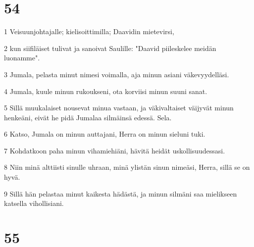 \chapter{54}

\par 1 Veisuunjohtajalle; kielisoittimilla; Daavidin mietevirsi,
\par 2 kun siifiläiset tulivat ja sanoivat Saulille: "Daavid piileskelee meidän luonamme".
\par 3 Jumala, pelasta minut nimesi voimalla, aja minun asiani väkevyydelläsi.
\par 4 Jumala, kuule minun rukoukseni, ota korviisi minun suuni sanat.
\par 5 Sillä muukalaiset nousevat minua vastaan, ja väkivaltaiset väijyvät minun henkeäni, eivät he pidä Jumalaa silmäinsä edessä. Sela.
\par 6 Katso, Jumala on minun auttajani, Herra on minun sieluni tuki.
\par 7 Kohdatkoon paha minun vihamiehiäni, hävitä heidät uskollisuudessasi.
\par 8 Niin minä alttiisti sinulle uhraan, minä ylistän sinun nimeäsi, Herra, sillä se on hyvä.
\par 9 Sillä hän pelastaa minut kaikesta hädästä, ja minun silmäni saa mielikseen katsella vihollisiani.

\chapter{55}

